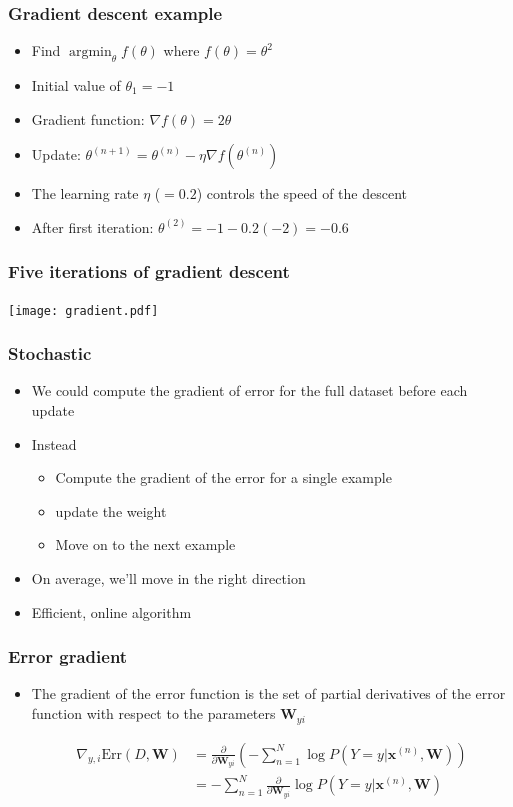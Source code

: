 \documentclass[14pt,mathserif,dvipsnames,usenames]{beamer}
\DeclareMathOperator*{\argmin}{argmin}
\newcommand{\x}{\mathbf{x}}
\newcommand{\W}{\mathbf{W}}
\newcommand{\voc}[1]{{\color{ForestGreen}#1}}
\begin{document}
\begin{frame}\frametitle{Gradient descent example}
  \begin{itemize}
  \item Find $\argmin_{\theta} f(\theta)$ where $f(\theta) = \theta^2$
  \item Initial value of $\theta_1 = -1$
  \item Gradient function: $\nabla f(\theta) = 2 \theta$
  \item Update: $\theta^{(n+1)} = \theta^{(n)} - \eta \nabla f(\theta^{(n)})$
  \item The \voc{learning rate} $\eta$ ($=0.2$) controls the speed of
    the descent
    \pause
  \item After first iteration: $\theta^{(2)} = -1 - 0.2 (-2) = -0.6$
  \end{itemize}
\end{frame}

\begin{frame}\frametitle{Five iterations of gradient descent}
  \begin{center}
    \texttt{[image: gradient.pdf]}
  \end{center}
\end{frame}

\begin{frame}\frametitle{Stochastic}
  \begin{itemize}
  \item We could compute the gradient of error for the full dataset
    before each update
  \item Instead
    \begin{itemize}
    \item Compute the gradient of the error for a single example
    \item update the weight
    \item Move on to the next example
    \end{itemize}
  \item On average, we'll move in the right direction
  \item Efficient, \voc{online} algorithm
  \end{itemize}
\end{frame}


\begin{frame}
  \frametitle{Error gradient}
  \begin{itemize}
  \item The gradient of the error function is the set of
    partial derivatives of the error function with respect to the
    parameters $\W_{yi}$
    \begin{small}
      \begin{align*}
        \nabla_{y,i} \mathrm{Err}(D,\W) & = \frac{\partial}{\partial
          \W_{yi}} \left(- \sum_{n=1}^N \log
          P(Y=y|\x^{(n)},\W)\right)\\
        & = - \sum_{n=1}^N \frac{\partial}{\partial \W_{yi}} \log
        P(Y=y|\x^{(n)},\W)
      \end{align*}
    \end{small}
  \end{itemize}
\end{frame}
\end{document}
